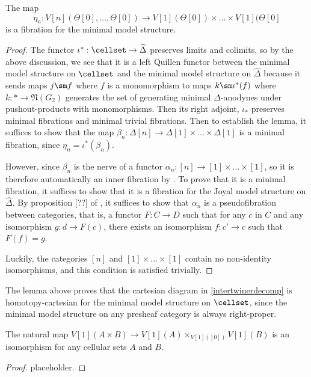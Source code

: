 \begin{lemma}
The map \[\eta_n : V[n](\Theta[0],\dots,\Theta[0])\to V[1](\Theta[0])\times\dots\times V[1](\Theta[0]\] is a fibration for the minimal model structure.
\end{lemma}
\begin{proof}

The functor \(\iota^\ast:\cellset \to \widehat{\Delta}\) preserves limits and colimits, so by the above discussion, we see that it is a left Quillen functor between the minimal model structure on \(\cellset\) and the minimal model structure on \(\widehat{\Delta}\) because it sends maps \(j\sm f\) where \(f\) is a monomorphism to maps \(k\sm \iota^\ast(f)\) where \(k:\ast \to \mathfrak{N}(G_2)\) generates the set of generating minimal \(\Delta\)-anodynes under pushout-products with monomorphisms.  Then its right adjoint, \(\iota_\ast\) preserves minimal fibrations and minimal trivial fibrations.  Then to establish the lemma, it suffices to show that the map \(\beta_n:\Delta[n]\to \Delta[1]\times \dots\times \Delta[1]\) is a minimal fibration, since \(\eta_n=\iota^\ast(\beta_n)\).   

However, since \(\beta_n\) is the nerve of a functor \(\alpha_n:[n]\to [1]\times\dots\times [1]\), so it is therefore automatically an inner fibration by \cite{lurie-book}.  To prove that it is a minimal fibration, it suffices to show that it is a fibration for the Joyal model structure on \(\widehat{\Delta}\).  By proposition [??] of \cite{joyal-quategory}, it suffices to show that \(\alpha_n\) is a pseudofibration between categories, that is, a functor \(F:C\to D\) such that for any \(c\) in \(C\) and any isomorphism \(g:d\to F(c)\), there exists an isomorphism \(f:c'\to c\) such that \(F(f)=g\).  

Luckily, the categories \([n]\) and \([1]\times \dots\times [1]\) contain no non-identity isomorphisms, and this condition is satisfied trivially.  
\end{proof}

The lemma above proves that the cartesian diagram in \eqref{intertwinerdecomp} is homotopy-cartesian for the minimal model structure on \(\cellset\), since the minimal model structure on any presheaf category is always right-proper.  

\begin{lemma}\label{prodpullback} The natural map \(V[1](A\times B)\to V[1](A)\times_{V[1]([0])} V[1](B)\) is an isomorphism for any cellular sets \(A\) and \(B\).  
\end{lemma}
\begin{proof}
placeholder.
\end{proof}

